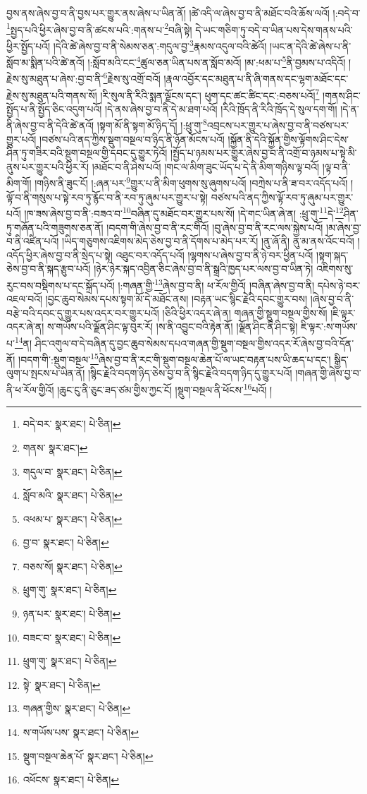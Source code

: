 བྱས་ནས་ཞེས་བྱ་བ་ནི་བྱས་པར་གྱུར་ནས་ཞེས་པ་ཡིན་ནོ། །ཚེ་འདི་ལ་ཞེས་བྱ་བ་ནི་མཐོང་བའི་ཆོས་ལའོ། །:བདེ་བ་\footnote{བདེ་བར་  སྣར་ཐང་།  པེ་ཅིན། }སྤྱད་པའི་ཕྱིར་ཞེས་བྱ་བ་ནི་ཚངས་པའི་:གནས་པ་\footnote{གནས་  སྣར་ཐང་། }བཞི་སྟེ། དེ་ཡང་གཅིག་ཏུ་བདེ་བ་ཡིན་པས་དེས་གནས་པའི་ཕྱིར་སྤྱོད་པའོ། །དེའི་ཚེ་ཞེས་བྱ་བ་ནི་སེམས་ཅན་:གདུལ་བྱ་\footnote{གདུལ་བ་  སྣར་ཐང་།  པེ་ཅིན། }རྣམས་འདུལ་བའི་ཚེའོ། །ཡང་ན་དེའི་ཚེ་ཞེས་པ་ནི་སློབ་མ་སྨིན་པའི་ཚེ་ནའོ། །:སློབ་མའི་ངང་\footnote{སློབ་མའི་  སྣར་ཐང་།  པེ་ཅིན། }ཚུལ་ཅན་ཡིན་པས་ན་སློབ་མའོ། །མ་:ཕམ་པ་\footnote{འཕམ་པ་  སྣར་ཐང་།  པེ་ཅིན། }ནི་བྱམས་པ་འདིའོ། །རྗེས་སུ་མཐུན་པ་ཞེས་:བྱ་བ་ནི་\footnote{བྱ་བ་  སྣར་ཐང་།  པེ་ཅིན། }རྗེས་སུ་འགྲོ་བའོ། །རྣལ་འབྱོར་དང་མཐུན་པ་ནི་ཞི་གནས་དང་ལྷག་མཐོང་དང་རྗེས་སུ་མཐུན་པའི་གནས་སོ། །རི་སུལ་ནི་རིའི་སྨན་ལྗོངས་དང་། ཕུག་དང་ཚང་ཚིང་དང་:བཅས་པའོ།\footnote{བཅས་སོ།  སྣར་ཐང་།  པེ་ཅིན། } །གནས་ཤིང་སྤྱོད་པ་ནི་སྤྱོད་ཅིང་འདུག་པའོ། །དེ་ནས་ཞེས་བྱ་བ་ནི་དེ་མ་ཐག་པའོ། །རིའི་ཁྲོད་ནི་རིའི་ཁྲོད་དེ་སུལ་དག་གོ། །དེ་ན་ནི་ཞེས་བྱ་བ་ནི་དེའི་ཚེ་ནའོ། །སྟག་མོ་ནི་སྟག་མོ་ཉིད་དོ། །:ཕྲུ་གུ་\footnote{ཕྲུག་གུ་  སྣར་ཐང་།  པེ་ཅིན། }འབྲངས་པར་གྱུར་པ་ཞེས་བྱ་བ་ནི་བཙས་པར་གྱུར་པའོ། །བཙས་པའི་ནད་ཀྱིས་སྡུག་བསྔལ་བ་ཉིད་ནི་ཉོན་མོངས་པའོ། །སྐྱོན་ནི་དེའི་སྐྱོན་གྱིས་ལྟོགས་ཤིང་དེས་ཤིན་ཏུ་གཟིར་བའི་སྡུག་བསྔལ་གྱི་དབང་དུ་གྱུར་ཏེའོ། །སྤྱོད་པ་ཉམས་པར་གྱུར་ཞེས་བྱ་བ་ནི་འགྲོ་བ་ཉམས་པ་སྟེ་མི་ནུས་པར་གྱུར་པའི་ཕྱིར་རོ། །མཐོང་བ་ནི་ཤེས་པའོ། །གང་ལ་མིག་ཟུང་ཡོད་པ་དེ་ནི་མིག་གཉིས་ལྟ་བའོ། །ལྟ་བ་ནི་མིག་གོ། །གཉིས་ནི་ཟུང་ངོ། །:ཞན་པར་\footnote{ཉན་པར་  སྣར་ཐང་།  པེ་ཅིན། }གྱུར་པ་ནི་མིག་ཕུགས་སུ་ཞུགས་པའོ། །བཀྲེས་པ་ནི་ཟ་བར་འདོད་པའོ། །ལྟོ་བ་ནི་གསུས་པ་སྟེ་རབ་ཏུ་རྙོང་བ་ནི་རབ་ཏུ་ཞུམ་པར་གྱུར་པ་སྟེ། བཙས་པའི་ནད་ཀྱིས་ལྟོ་རབ་ཏུ་ཞུམ་པར་གྱུར་པའོ། །ཁ་ཟས་ཞེས་བྱ་བ་ནི་:བཟའ་བ་\footnote{བཟང་བ་  སྣར་ཐང་།  པེ་ཅིན། }བཞིན་དུ་མཐོང་བར་གྱུར་པས་སོ། །དེ་གང་ཡིན་ཞེ་ན། :ཕྲུ་གུ་\footnote{ཕྲུག་གུ་  སྣར་ཐང་།  པེ་ཅིན། }དེ་\footnote{སྟེ་  སྣར་ཐང་།  པེ་ཅིན། }ཤིན་ཏུ་གཞོན་པའི་གཟུགས་ཅན་ནོ། །བདག་གི་ཞེས་བྱ་བ་ནི་རང་གིའོ། །བུ་ཞེས་བྱ་བ་ནི་རང་ལས་སྐྱེས་པའོ། །མ་ཞེས་བྱ་བ་ནི་འཛིན་པའོ། །ཡིད་གཅུགས་འཇིགས་མེད་ཅེས་བྱ་བ་ནི་དོགས་པ་མེད་པར་རོ། །ནུ་ཞོ་ནི། ནུ་མ་ནས་འོང་བའོ། །འདོད་ཕྱིར་ཞེས་བྱ་བ་ནི་སྲེད་པ་སྟེ། འཐུང་བར་འདོད་པའོ། །ལྷགས་པ་ཞེས་བྱ་བ་ནི་ཉེ་བར་ཕྱིན་པའོ། །སྟག་སྐད་ཅེས་བྱ་བ་ནི་སྐད་རྩུབ་པའོ། །ཉེར་ཉེར་སྐད་འབྱིན་ཅིང་ཞེས་བྱ་བ་ནི་སྒྲའི་ཁྱད་པར་ལས་བྱ་བ་ཡིན་ཏེ། འཇིགས་སུ་རུང་བས་བསྡིགས་པ་དང་སྐྲོད་པའོ། །:གཞན་གྱི་\footnote{གཞན་གྱིས་  སྣར་ཐང་།  པེ་ཅིན། }ཞེས་བྱ་བ་ནི། ཕ་རོལ་གྱིའོ། །བཞིན་ཞེས་བྱ་བ་ནི། དཔེས་ཉེ་བར་འཇལ་བའོ། །བྱང་ཆུབ་སེམས་དཔས་སྟག་མོ་དེ་མཐོང་ནས། །བརྟན་ཡང་སྙིང་རྗེའི་དབང་གྱུར་བས། །ཞེས་བྱ་བ་ནི་བརྩེ་བའི་དབང་དུ་གྱུར་པས་འདར་བར་གྱུར་པའོ། །ཅིའི་ཕྱིར་འདར་ཞེ་ན། གཞན་གྱི་སྡུག་བསྔལ་གྱིས་སོ། །ཇི་ལྟར་འདར་ཞེ་ན། ས་གཡོས་པའི་ལྗོན་ཤིང་ལྟ་བུར་རོ། །ས་ནི་འབྱུང་བའི་རྟེན་ནོ། །ལྗོན་ཤིང་ནི་ཤིང་སྟེ། ཇི་ལྟར་:ས་གཡོས་པ་\footnote{ས་གཡོས་པས་  སྣར་ཐང་།  པེ་ཅིན། }ན། ཤིང་འགུལ་བ་དེ་བཞིན་དུ་བྱང་ཆུབ་སེམས་དཔའ་གཞན་གྱི་སྡུག་བསྔལ་གྱིས་འདར་རོ་ཞེས་བྱ་བའི་དོན་ནོ། །བདག་གི་:སྡུག་བསྔལ་\footnote{སྡུག་བསྔལ་ཆེན་པོ་  སྣར་ཐང་།  པེ་ཅིན། }ཞེས་བྱ་བ་ནི་རང་གི་སྡུག་བསྔལ་ཆེན་པོ་ལ་ཡང་བརྟན་པས་ཡི་ཆད་པ་དང་། སྒྱིད་ལུག་པ་སྤངས་པ་ཡིན་ནོ། །སྙིང་རྗེའི་བདག་ཉིད་ཅེས་བྱ་བ་ནི་སྙིང་རྗེའི་བདག་ཉིད་དུ་གྱུར་པའོ། །གཞན་གྱི་ཞེས་བྱ་བ་ནི་ཕ་རོལ་གྱིའོ། །ཆུང་ངུ་ནི་ཅུང་ཟད་ཙམ་གྱིས་ཀྱང་ངོ། །སྡུག་བསྔལ་ནི་ཕོངས་\footnote{འཕོངས་  སྣར་ཐང་།  པེ་ཅིན། }པའོ། །
